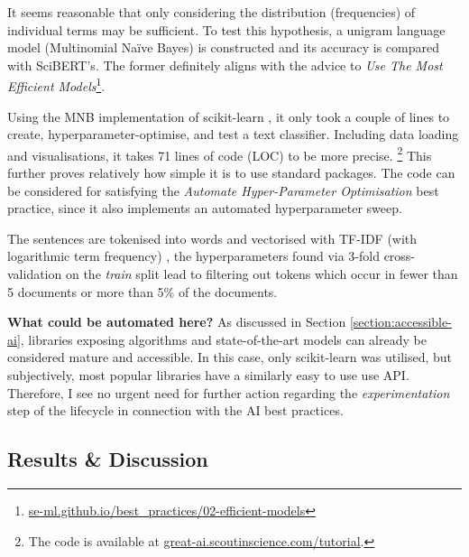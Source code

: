 It seems reasonable that only considering the distribution (frequencies) of individual terms may be sufficient. To test this hypothesis, a unigram language model (Multinomial Naïve Bayes) is constructed and its accuracy is compared with SciBERT's. The former definitely aligns with the advice to \textit{Use The Most Efficient Models}\footnote{\href{https://se-ml.github.io/best_practices/02-efficient-models/}{se-ml.github.io/best\_practices/02-efficient-models}}.

Using the MNB implementation of scikit-learn \cite{pedregosa2011scikit}, it only took a couple of lines to create, hyperparameter-optimise, and test a text classifier. Including data loading and visualisations, it takes 71 lines of code (LOC) to be more precise. \footnote{The code is available at \href{https://great-ai.scoutinscience.com/tutorial/}{great-ai.scoutinscience.com/tutorial}.} This further proves relatively how simple it is to use standard packages. The code can be considered for satisfying the \textit{Automate Hyper-Parameter Optimisation} best practice, since it also implements an automated hyperparameter sweep. 

The sentences are tokenised into words and vectorised with TF-IDF (with logarithmic term frequency) \cite{buckley1985implementation}, the hyperparameters found via 3-fold cross-validation on the \textit{train} split lead to filtering out tokens which occur in fewer than 5 documents or more than 5\% of the documents.

\begin{displayquote}
\textbf{What could be automated here?} As discussed in Section \ref{section:accessible-ai}, libraries exposing algorithms and state-of-the-art models can already be considered mature and accessible. In this case, only scikit-learn was utilised, but subjectively, most popular libraries have a similarly easy to use use API. Therefore, I see no urgent need for further action regarding the \textit{experimentation} step of the lifecycle in connection with the AI best practices.
\end{displayquote}

\subsection{Results \& Discussion}

